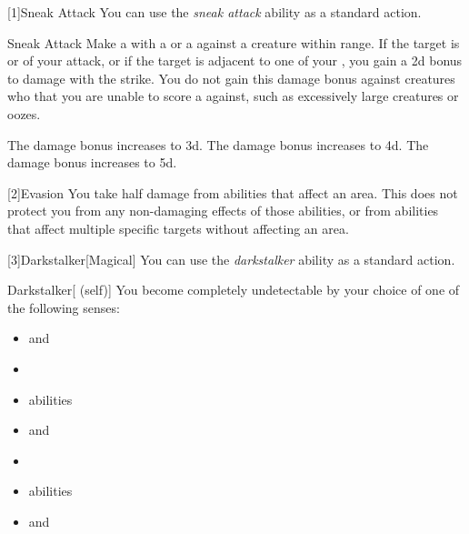         [1]{Sneak Attack}
        You can use the \textit{sneak attack} ability as a standard action.
        \begin{freeability}{Sneak Attack}
            Make a  with a  or a  against a creature within \rngshort range.
            If the target is  or  of your attack, or if the target is adjacent to one of your , you gain a \plus2d bonus to damage with the strike.
            You do not gain this damage bonus against creatures who that you are unable to score a  against, such as excessively large creatures or oozes.

            \rankline
             The damage bonus increases to \plus3d.
             The damage bonus increases to \plus4d.
             The damage bonus increases to \plus5d.
        \end{freeability}

        [2]{Evasion} You take half damage from abilities that affect an area.
        This does not protect you from any non-damaging effects of those abilities, or from abilities that affect multiple specific targets without affecting an area.

        [3]{Darkstalker}[Magical] You can use the \textit{darkstalker} ability as a standard action.
        \begin{attuneability}{Darkstalker}[ (self)]
            You become completely undetectable by your choice of one of the following senses:
            \begin{itemize}
                \item {} and 
                \item {}
                \item {} abilities
                \item {} and 
                \item {}
                \item {} abilities
                \item {} and 
            \end{itemize}
        \end{attuneability}

